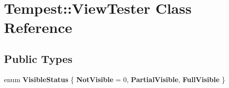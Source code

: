 \hypertarget{class_tempest_1_1_view_tester}{\section{Tempest\+:\+:View\+Tester Class Reference}
\label{class_tempest_1_1_view_tester}
}
\subsection*{Public Types}
\begin{DoxyCompactItemize}
\item 
\hypertarget{class_tempest_1_1_view_tester_a77d1c19be65672a77a15f0f20aeb2902}{enum {\bfseries Visible\+Status} \{ {\bfseries Not\+Visible} = 0, 
{\bfseries Partial\+Visible}, 
{\bfseries Full\+Visible}
 \}}\label{class_tempest_1_1_view_tester_a77d1c19be65672a77a15f0f20aeb2902}

\end{DoxyCompactItemize}
